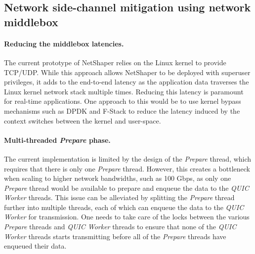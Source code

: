 \subsection{Network side-channel mitigation using network middlebox}
\label{subsec:future-work-netshaper}

\paragraph{Reducing the middlebox latencies.}
The current prototype of NetShaper relies on the Linux kernel to provide TCP/UDP. 
While this approach allows NetShaper to be deployed with superuser privileges, it adds to the end-to-end latency as the application data traverses the Linux kernel network stack multiple times.
Reducing this latency is paramount for real-time applications.
One approach to this would be to use kernel bypass mechanisms such as DPDK \cite{dpdk} and F-Stack \cite{fstack} to reduce the latency induced by the context switches between the kernel and user-space.

\paragraph{Multi-threaded \textit{Prepare} phase.}
The current implementation is limited by the design of the \textit{Prepare} thread, which requires that there is only one \textit{Prepare} thread.
However, this creates a bottleneck when scaling to higher network bandwidths, such as 100 Gbps, as only one \textit{Prepare} thread would be available to prepare and enqueue the data to the \textit{QUIC Worker} threads.
This issue can be alleviated by splitting the \textit{Prepare} thread further into multiple threads, each of which can enqueue the data to the \textit{QUIC Worker} for transmission.
One needs to take care of the locks between the various \textit{Prepare} threads and \textit{QUIC Worker} threads to ensure that none of the \textit{QUIC Worker} threads starts transmitting before all of the \textit{Prepare} threads have enqueued their data.

